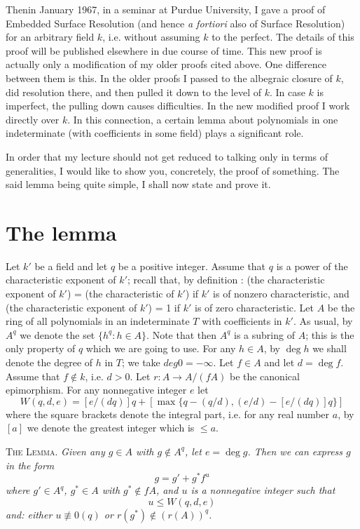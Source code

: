 Then\pageoriginale in January 1967, in a seminar at Purdue University, I gave a proof of Embedded Surface Resolution (and hence {\em a fortiori} also of Surface Resolution) for an arbitrary field $k$, i.e. without assuming $k$ to the perfect. The details of this proof will be published elsewhere in due course of time. This new proof is actually only a modification of my older proofs cited above. One difference between them is this. In the older proofs I passed to the albegraic closure of $k$, did resolution there, and then pulled it down to the level of $k$. In case $k$ is imperfect, the pulling down causes difficulties. In the new modified proof I work directly over $k$. In this connection, a certain lemma about polynomials in one indeterminate (with coefficients in some field) plays a significant role.

In order that my lecture should not get reduced to talking only in terms of generalities, I would like to show you, concretely, the proof of something. The said lemma being quite simple, I shall now state and prove it.

\section{The lemma}\label{art01-sec2}

Let $k'$ be a field and let $q$ be a positive integer. Assume that $q$ is a power of the characteristic exponent of $k'$; recall that, by definition : (the characteristic exponent of $k'$) = (the characteristic of $k'$) if $k'$ is of nonzero characteristic, and (the characteristic exponent of $k'$) = 1 if $k'$ is of zero characteristic. Let $A$ be the ring of all polynomials in an indeterminate $T$ with coefficients in $k'$. As usual, by $A^{q}$ we denote the set $\{h^{q}:h\in A\}$. Note that then $A^{q}$ is a subring of $A$; this is the only property of $q$ which we are going to use. For any $h\in A$, by $\deg h$ we shall denote the degree of $h$ in $T$; we take $deg 0 = -\infty$. Let $f\in A$ and let $d=\deg f$. Assume that $f\not\in k$, i.e. $d>0$. Let $r:A\to A/(fA)$ be the canonical epimorphism. For any nonnegative integer $e$ let
$$
W(q,d,e)=[e/(dq)]q+[\max \{q-(q/d),(e/d)-[e/(dq)]q\}]
$$
where the square brackets denote the integral part, i.e. for any real number $a$, by $[a]$ we denote the greatest integer which is $\leq a$.

\medskip
\textsc{The Lemma.} {\em Given any $g\in A$ with $g\not\in A^{q}$, let $e=\deg g$. Then we can express $g$ in the form}
$$
g=g'+g^{*}f^{u}
$$\pageoriginale
{\em where $g'\in A^{q}$, $g^{*}\in A$ with $g^{*}\not\in fA$, and $u$ is a nonnegative integer such that}
$$
u\leq W(q,d,e)
$$
{\em and: either $u\nequiv 0(q)$ or $r(g^{*})\not\in (r(A))^{q}$.}


